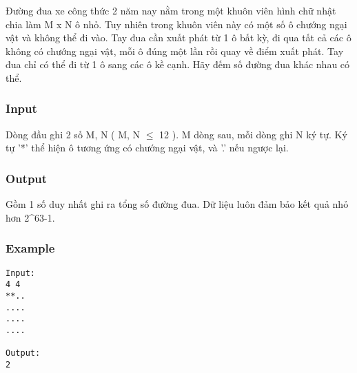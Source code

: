 



   Đường đua xe công thức 2 năm nay nằm trong một khuôn viên hình chữ nhật chia làm M x N ô nhỏ. Tuy nhiên trong khuôn viên này có một số ô chướng ngại vật và không thể đi vào. Tay đua cần xuất phát từ 1 ô bất kỳ, đi qua tất cả các ô không có chướng ngại vật, mỗi ô đúng một lần rồi quay về điểm xuất phát. Tay đua chỉ có thể đi từ 1 ô sang các ô kề cạnh. Hãy đếm số đường đua khác nhau có thể.  

\subsubsection{   Input  }

   Dòng đầu ghi 2 số M, N ( M, N  $\le$  12 ). M dòng sau, mỗi dòng ghi N ký tự. Ký tự '*' thể hiện ô tương ứng có chướng ngại vật, và '.' nếu ngược lại.  

\subsubsection{   Output  }

   Gồm 1 số duy nhất ghi ra tổng số đường đua. Dữ liệu luôn đảm bảo kết quả nhỏ hơn 2\textasciicircum63-1.  

\subsubsection{   Example  }
\begin{verbatim}
Input:
4 4
**..
....
....
....

Output:
2
\end{verbatim}
